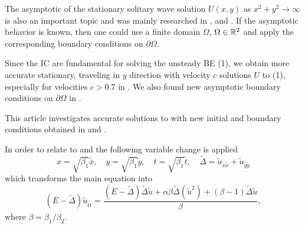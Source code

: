 \documentclass[11pt,a4paper,twoside]{article}
\begin{document}
The asymptotic of the stationary solitary wave solution $U(x,y)$ as $x^2+y^2 \rightarrow \infty$ is also an important topic and was mainly researched in \cite{chr-chr-07}, \cite{Ch2012} and \cite{BoundaryProblem}. If the asymptotic behavior is known, then one could use a finite domain $\Omega$,  $\Omega \in \mathbb{R}^2$ and apply the corresponding boundary conditions on $\partial \Omega$. 

Since the IC are  fundamental for solving the unsteady BE (1), we obtain more accurate stationary, traveling in $y$  direction with velocity $c$ solutions $U$ to (1), especially for velocities $c > 0.7$ in \cite{EllipticProblem}. We also found new asymptotic boundary conditions on $\partial \Omega$ in \cite{BoundaryProblem}.

This article investigates accurate solutions to  with new initial and boundary conditions obtained in \cite{EllipticProblem} and \cite{BoundaryProblem}. 

In order to relate to \cite{EllipticProblem} and \cite{BoundaryProblem}
the following variable change is applied
\begin{equation}\label{vc}
x = \sqrt{\beta_1} \tilde x, \quad y = \sqrt{\beta_1} \tilde y, \quad t = \sqrt{\beta_1} \tilde t, \quad \tilde \Delta = \tilde u_{\tilde x \tilde x} + \tilde u_{\tilde y \tilde y}
\end{equation}
which transforms the main equation   into 
\begin{equation}\label{eqVC}
(E-\tilde \Delta)  \tilde u_{\tilde t \tilde t} = \frac{(E-\tilde\Delta)\tilde\Delta \tilde u + \alpha \beta \tilde\Delta(\tilde u^2) + (\beta -1)\tilde\Delta \tilde u}{\beta},
\end{equation}
where $\beta = \beta_1 / \beta_2$. 
%
%
%
\end{document}

